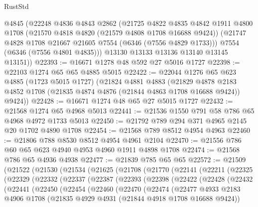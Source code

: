 \begin{lexlean}{RustStd}
\begin{coremodule}
      @4845
      (@22248
        @4836
        @4843
        @2862
        (@21725
          @4822
          @4835
          @4842
          @1911
          @4800
          @1708
          (@21570 @4818 @4820 (@21579 @4808 @1708 @16688 @9424))
          (@21747 @4828 @1708 @21667 @21605 @7554 (@6346 (@7556 @4829 @1733)))
          @7554
          (@6346 (@7556 @4801 @4835)))
        @13130
        @13133
        @13136
        @13140
        @13145
        @13151))
@22393 := @16671 @1278 @48 @592 @27 @5016 @1727
@22398 := @22103 @1274 @65 @65 @4885 @5015
@22422 := @22044
    @1276
    @65
    @623
    @4885
    (@1723 @5015 @1727)
    (@21824
      @4881
      @4883
      (@21829 @4878 @2183 @4852 @1708 (@21835 @4874 @4876 (@21844 @4863 @1708 @16688 @9424)) @9424))
@22428 := @16671 @1274 @48 @65 @27 @5015 @1727
@22432 := @21568 @1274 @65 @4968 @5013
@22441 := @21536 @1550 @791 @58 @786 @65 @4968 @4972 @1733 @5013
@22450 := @21792 @789 @294 @371 @4965 @2145 @20 @1702 @4890 @1708
@22454 := @21568 @789 @8512 @4954 @4963
@22460 := @21806 @788 @8530 @8512 @4954 @4961 @2104
@22470 := @21556 @786 @60 @65 @623 @4940 @4953 @4960 @1911 @4898 @1708
@22474 := @21568 @786 @65 @4936 @4938
@22477 := @21839 @785 @65 @65
@22572 := @21509
    (@21522
      (@21530
        (@21534
          (@21625
            (@21708
              (@21770
                (@22141
                  (@22211
                    (@22325
                      (@22329
                        (@22332
                          (@22337
                            (@22387
                              (@22393
                                (@22398
                                  (@22422
                                    (@22428
                                      (@22432
                                        (@22441
                                          (@22450
                                            (@22454
                                              (@22460
                                                (@22470
                                                  (@22474
                                                    (@22477
                                                      @4933
                                                      @2183
                                                      @4906
                                                      @1708
                                                      (@21835
                                                        @4929
                                                        @4931
                                                        (@21844 @4918 @1708 @16688 @9424))

\end{coremodule}
\end{lexlean}
